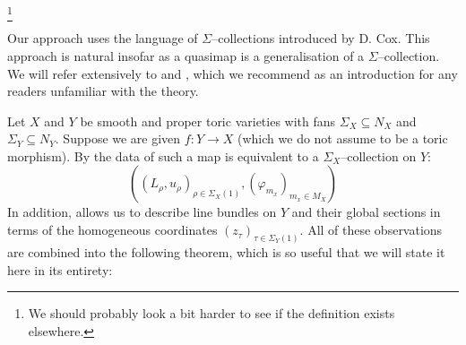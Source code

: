 \documentclass[11pt]{amsart}
\renewcommand{\to}{\rightarrow}
\theoremstyle{plain}
\theoremstyle{definition}
\begin{document}
\footnote{We should probably look a bit harder to see if the definition exists elsewhere.}

Our approach uses the language of $\Sigma$--collections introduced by D. Cox. This approach is natural insofar as a quasimap is a generalisation of a $\Sigma$--collection. We will refer extensively to \cite{CoxRing} and \cite{CoxFunctor}, which we recommend as an  introduction for any readers unfamiliar with the theory.

Let $X$ and $Y$ be smooth and proper toric varieties with fans $\Sigma_X \subseteq N_X$ and $\Sigma_Y \subseteq N_Y$. Suppose we are given $f : Y \to X$ (which we do not assume to be a toric morphism). By \cite[Theorem 1.1]{CoxFunctor} the data of such a map is equivalent to a $\Sigma_X$--collection on $Y$:
\begin{equation*} ( (L_\rho, u_\rho)_{\rho \in \Sigma_X(1)}, (\varphi_{m_x})_{m_x \in M_X} ) \end{equation*}
In addition, \cite{CoxRing} allows us to describe line bundles on $Y$ and their global sections in terms of the homogeneous coordinates $(z_\tau)_{\tau \in \Sigma_Y(1)}$. All of these observations are combined into the following theorem, which is so useful that we will state it here in its entirety:
\end{document}
